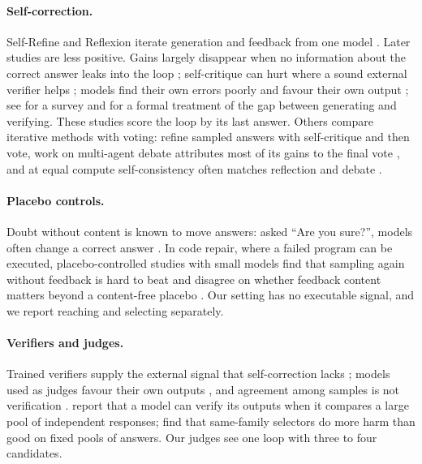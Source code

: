 \documentclass[11pt]{article}
\begin{document}
\paragraph{Self-correction.}
Self-Refine and Reflexion iterate generation and feedback from one model \citep{madaan2023selfrefine,shinn2023reflexion}.
Later studies are less positive.
Gains largely disappear when no information about the correct answer leaks into the loop \citep{huang2024cannot}; self-critique can hurt where a sound external verifier helps \citep{stechly2024selfverification}; models find their own errors poorly \citep{tyen2024cannot} and favour their own output \citep{xu2024pride}; see \citet{kamoi2024when} for a survey and \citet{song2024mindgap} for a formal treatment of the gap between generating and verifying.
These studies score the loop by its last answer.
Others compare iterative methods with voting: \citet{bilal2026refining} refine sampled answers with self-critique and then vote, work on multi-agent debate attributes most of its gains to the final vote \citep{smit2024mad,choi2025debate}, and at equal compute self-consistency often matches reflection and debate \citep{wang2024token}.

\paragraph{Placebo controls.}
Doubt without content is known to move answers: asked ``Are you sure?'', models often change a correct answer \citep{laban2024flipflop}.
In code repair, where a failed program can be executed, placebo-controlled studies with small models find that sampling again without feedback is hard to beat and disagree on whether feedback content matters beyond a content-free placebo \citep{iscan2026falsification,iscan2026form,verma2026blind}.
Our setting has no executable signal, and we report reaching and selecting separately.

\paragraph{Verifiers and judges.}
Trained verifiers supply the external signal that self-correction lacks \citep{lightman2024verify}; models used as judges favour their own outputs \citep{zheng2023judging,panickssery2024evaluators}, and agreement among samples is not verification \citep{denisov2026consensus}.
\citet{zhao2025sample} report that a model can verify its outputs when it compares a large pool of independent responses; \citet{hu2026oracle} find that same-family selectors do more harm than good on fixed pools of answers.
Our judges see one loop with three to four candidates.
\end{document}

